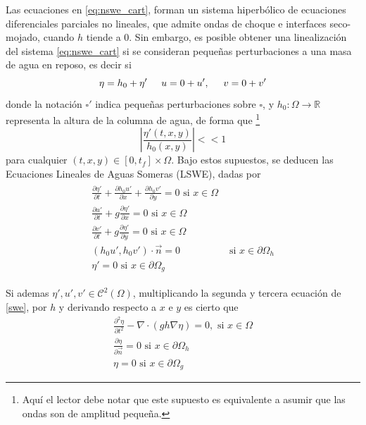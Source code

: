 Las ecuaciones en \eqref{eq:nswe_cart}, forman un sistema hiperb\'olico de ecuaciones diferenciales parciales no lineales, que admite ondas de choque e interfaces seco-mojado, cuando $h$ tiende a $0$. Sin embargo, es posible obtener una linealizaci\'on del sistema \eqref{eq:nswe_cart} si se consideran peque\~nas perturbaciones a una masa de agua en reposo, es decir si
$$
	\eta=h_0+\eta' \hspace{.5cm} u=0+u',\hspace{.5cm} v = 0 + v'
$$
donde la notaci\'on $\square'$ indica peque\~nas perturbaciones sobre $\square$, y $h_0:\Omega\rightarrow \mathbb{R}$ representa la altura de la columna de agua, de forma que  \footnote{Aqu\'i el lector debe notar que este supuesto es equivalente a asumir que las ondas son de amplitud peque\~na.}
$$\left|\frac{\eta'(t,x,y)}{h_0(x,y)}\right|<<1$$
para cualquier $(t,x,y) \in [0,t_f]\times\Omega$. Bajo estos supuestos, se deducen las Ecuaciones Lineales de Aguas Someras (LSWE), dadas por
\begin{align}
	\begin{split}
	\frac{\partial \eta'}{\partial t}+\frac{\partial h_0u'}{\partial x}+\frac{\partial h_0v'}{\partial y} = 0  \text{ si } x \in \Omega\\
    \frac{\partial u'}{\partial t} + g\frac{\partial \eta'}{\partial x}=0  \text{ si } x \in \Omega\\
    \frac{\partial v'}{\partial t} + g\frac{\partial \eta'}{\partial y} = 0  \text{ si } x \in \Omega \\
    (h_0u',h_0v') \cdot \vec n = 0 & \text{ si } x\in\partial \Omega_h \\
   \eta' = 0  \text{ si } x \in \partial \Omega_g  
    \end{split}
    \label{swe}
\end{align}

    Si ademas $\eta',u',v' \in \mathcal{C}^2(\Omega)$, multiplicando la segunda y tercera ecuaci\'on de \eqref{swe}, por $h$ y derivando respecto a $x$ e $y$ es cierto que 
    \begin{equation}
    	\begin{split}
    	\frac{\partial^2 \eta}{\partial t^2} - \nabla \cdot( gh \nabla \eta) = 0, \text{ si } x \in \Omega \\
        \frac{\partial \eta}{\partial \vec n} = 0 \text{ si } x \in \partial \Omega_h \\
        \eta = 0 \text{ si }x \in \partial \Omega_g
        \end{split}
     \label{eqonda}
    \end{equation}

